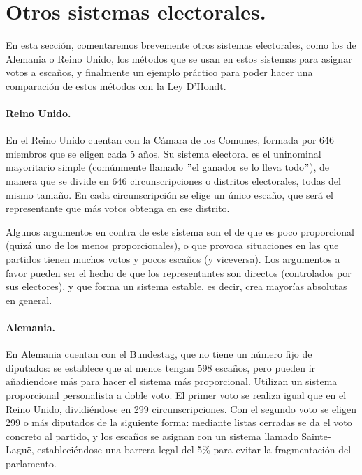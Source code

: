 \documentclass[11pt]{article}
\begin{document}
	\section{Otros sistemas electorales.}
	
	En esta sección, comentaremos brevemente otros sistemas electorales, como los de Alemania o Reino Unido, los métodos que se usan en estos sistemas para asignar votos a escaños, y finalmente un ejemplo práctico para poder hacer una comparación de estos métodos con la Ley D'Hondt.
	
\paragraph{Reino Unido.}

En el Reino Unido cuentan con la Cámara de los Comunes, formada por 646 miembros que se eligen cada 5 años. Su sistema electoral es el uninominal mayoritario simple (comúnmente llamado $"$el ganador se lo lleva todo$"$), de manera que se divide en 646 circunscripciones o distritos electorales, todas del mismo tamaño. En cada circunscripción se elige un único escaño, que será el representante que más votos obtenga en ese distrito.

Algunos argumentos en contra de este sistema son el de que es poco proporcional (quizá uno de los menos proporcionales), o que provoca situaciones en las que partidos tienen muchos votos y pocos escaños (y viceversa). Los argumentos a favor pueden ser el hecho de que los representantes son directos (controlados por sus electores), y que forma un sistema estable, es decir, crea mayorías absolutas en general.

\paragraph{Alemania.}

En Alemania cuentan con el Bundestag, que no tiene un número fijo de diputados: se establece que al menos tengan 598 escaños, pero pueden ir añadiendose más para hacer el sistema más proporcional. Utilizan un sistema proporcional personalista a doble voto. El primer voto se realiza igual que en el Reino Unido, dividiéndose en 299 circunscripciones. Con el segundo voto se eligen 299 o más diputados de la siguiente forma: mediante listas cerradas se da el voto concreto al partido, y los escaños se asignan con un sistema llamado Sainte-Laguë, estableciéndose una barrera legal del 5\% para evitar la fragmentación del parlamento.
\end{document}
